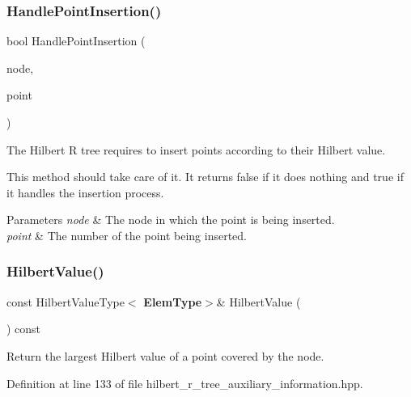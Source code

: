 \subsubsection{Handle\+Point\+Insertion()}
{\footnotesize\ttfamily bool Handle\+Point\+Insertion (\begin{DoxyParamCaption}\item[{Tree\+Type $\ast$}]{node,  }\item[{const size\+\_\+t}]{point }\end{DoxyParamCaption})}



The Hilbert R tree requires to insert points according to their Hilbert value. 

This method should take care of it. It returns false if it does nothing and true if it handles the insertion process.


\begin{DoxyParams}{Parameters}
{\em node} & The node in which the point is being inserted. \\
\hline
{\em point} & The number of the point being inserted. \\
\hline
\end{DoxyParams}
\mbox{\label{classmlpack_1_1tree_1_1HilbertRTreeAuxiliaryInformation_a7e7444bd9435cbd1dc45cc0295788207}} 
\subsubsection{Hilbert\+Value()\hspace{0.1cm}{\footnotesize\ttfamily [1/2]}}
{\footnotesize\ttfamily const Hilbert\+Value\+Type$<$\textbf{ Elem\+Type}$>$\& Hilbert\+Value (\begin{DoxyParamCaption}{ }\end{DoxyParamCaption}) const\hspace{0.3cm}{\ttfamily [inline]}}



Return the largest Hilbert value of a point covered by the node. 



Definition at line 133 of file hilbert\+\_\+r\+\_\+tree\+\_\+auxiliary\+\_\+information.\+hpp.

